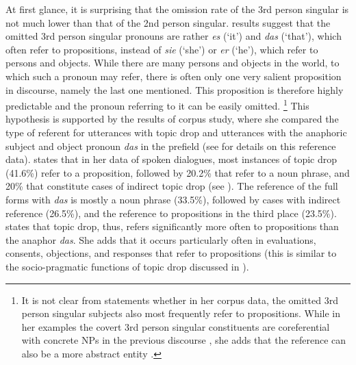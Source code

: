 At first glance, it is surprising that the omission rate of the 3rd person singular is not much lower than that of the 2nd person singular.
 results suggest that the omitted 3rd person singular pronouns are rather \textit{es} (`it') and \textit{das} (`that'), which often refer to propositions, instead of \textit{sie} (`she') or \textit{er} (`he'), which refer to persons and objects.
While there are many persons and objects in the world, to which such a pronoun may refer, there is often only one very salient  proposition in discourse, namely the last one mentioned.
This proposition is therefore highly predictable  and the pronoun referring to it can be easily omitted.%
\footnote{It is not clear from  statements whether in her corpus data, the omitted 3rd person singular subjects also most frequently refer to propositions.
While in her examples the covert 3rd person singular constituents are coreferential with concrete NPs in the previous discourse \citep[106]{frick2017}, she adds that the reference can also be a more abstract entity \citep[107, footnote 120]{frick2017}.}
%
This hypothesis is supported by the results of  corpus study, where she compared the type of referent for utterances with topic drop and utterances with the anaphoric subject and object pronoun \textit{das} in the prefield (see  for details on this reference data).
\citet[210--211]{helmer2016} states that in her data of spoken dialogues, most instances of topic drop (41.6\%) refer to a proposition, followed by 20.2\% that refer to a noun phrase, and 20\% that constitute cases of indirect topic drop (see ).
The reference of the full forms with \textit{das} is mostly a noun phrase (33.5\%), followed by cases with indirect reference (26.5\%), and the reference to propositions in the third place (23.5\%).
\citet{helmer2016} states that topic drop, thus, refers significantly more often to propositions than the anaphor \textit{das}.
She adds that it occurs particularly often in evaluations, consents, objections, and responses that refer to propositions (this is similar to the socio-pragmatic functions of topic drop discussed in ).

